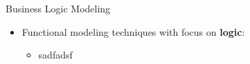 \begin{Slide}{Business Logic Modeling}
\begin{itemize}
\item Functional modeling techniques with focus on \textbf{logic}:
\begin{itemize}
\item sadfadsf

\end{itemize}
\end{itemize}
\end{Slide}